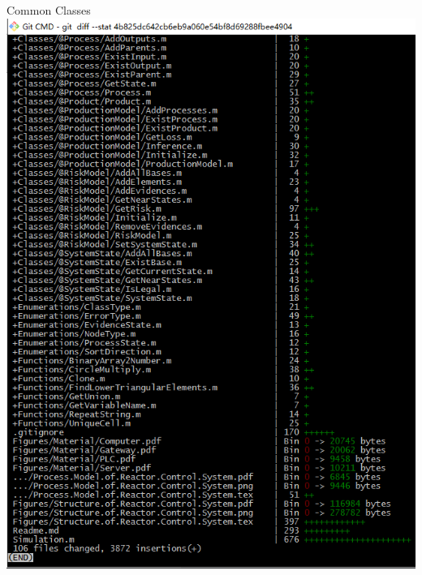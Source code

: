 \documentclass[10pt]{beamer}
\begin{document}
\begin{frame}{Common Classes}
  \centering
  \includegraphics[height = \textheight]{Figures/Line.Count.png}
\end{frame}
\end{document}
